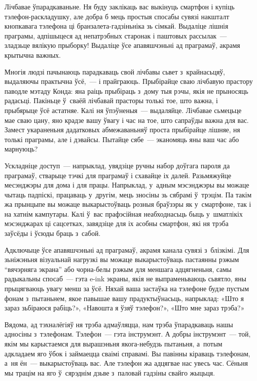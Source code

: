 Лічбавае ўпарадкаваньне. Ня буду заклікаць вас выкінуць смартфон і купіць тэлефон-раскладушку, але добра б мець простыя спосабы сувязі накшталт кнопкавага тэлефона ці бранзалета-гадзіньніка зь сімкай. Выдаліце лішнія праграмы, адпішыцеся ад непатрэбных старонак і паштовых рассылак~--- зладзьце вялікую прыборку! Выдаліце ўсе апавяшчэньні ад праграмаў, акрамя крытычна важных.

Многія людзі пачынаюць парадкаваць свой лічбавы сьвет з~крайнасьцяў, выдаляючы практычна ўсё,~--- і прайграюць. Прыбірайце сваю лічбавую прастору паводле мэтаду Конда: яна раіць прыбіраць з~дому тыя рэчы, якія не прыносяць радасьці. Пакіньце ў~сваёй лічбавай прасторы толькі тое, што важна, і прыбярыце ўсё астатняе. Калі ня ўпэўненыя~--- выдаляйце. Лічбавае сьмецьце мае сваю цану, яно крадзе вашу ўвагу і час на тое, што сапраўды важна для вас. Замест укараненьня дадатковых абмежаваньняў проста прыбірайце лішняе, ня толькі праграмы, але і дэвайсы. Пытайце сябе~--- эканомяць яны ваш час або марнуюць?

Ускладніце доступ~--- напрыклад, увядзіце ручны набор доўгага пароля да праграмаў, стварыце тэчкі для праграмаў і схавайце іх далей. Разьмяжуйце месэнджэры для дома і для працы. Напрыклад, у~адным мэсэнджэры вы можаце чытаць падпіскі, працаваць у~другім, мець зносіны зь сябрамі ў~трэцім. Па такім жа прынцыпе вы можаце выкарыстоўваць розныя браўзэры як у~смартфоне, так і на хатнім кампутары. Калі ў~вас прафэсійная неабходнасьць быць у~шматлікіх мэсэнджарах ці сацсетках, завядзіце для іх асобны смартфон, які ня трэба заўсёды і ўсюды браць з~сабой.

Адключыце ўсе апавяшчэньні ад праграмаў, акрамя канала сувязі з~блізкімі. Для зьніжэньня візуальнай нагрузкі вы можаце выкарыстоўваць пастаянны рэжым ``вячэрняга экрана'' або чорна-белы рэжым для меншага адцягненьня, самы радыкальны спосаб~--- гэта e-ink экраны, якія не выпраменьваюць сьвятло, яны прыцягваюць увагу менш за ўсё. Няхай ваша застаўка на тэлефоне будзе пустым фонам з~пытаньнем, якое павышае вашу прадуктыўнасьць, напрыклад: «Што я зараз зьбіраюся рабіць?», «Навошта я ўзяў тэлефон?», «Што мне зараз трэба?»

Вядома, ад тэхналёгіяў ня трэба адмаўляцца, нам трэба ўпарадкаваць нашы адносіны з~тэлефонам. Тэлефон~--- гэта інструмэнт. А добры інструмэнт~--- той, якім мы карыстаемся для вырашэньня якога-небудзь пытаньня, а~потым адкладаем яго ўбок і займаецца сваімі справамі. Вы павінны кіраваць тэлефонам, а~ня ён~--- выкарыстоўваць вас. Але тэлефон жа адцягвае нас увесь час. Сёньня мы трацім на яго ў~сярэднім дзьве з~паловай гадзіны свайго жыцьця.

